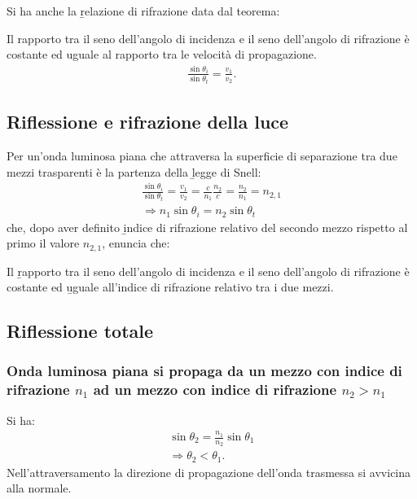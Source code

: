 Si ha anche la \b{relazione di rifrazione} data dal teorema:
\begin{teo}
Il rapporto tra il seno dell'angolo di incidenza e il seno dell'angolo di rifrazione è costante ed uguale al rapporto tra le velocità di propagazione.
\begin{equation}\begin{split}
\frac{\sin{\theta_i}}{\sin{\theta_t}}=\frac{v_1}{v_2}.
\end{split}\end{equation}
\end{teo}

\subsection{Riflessione e rifrazione della luce}
Per un'onda luminosa piana che attraversa la superficie di separazione tra due mezzi trasparenti è la partenza della \b{legge di Snell}:
\begin{equation}\begin{split}
\frac{\sin{\theta_i}}{\sin{\theta_t}}=\frac{v_1}{v_2}=\frac{c}{n_1}\frac{n_2}{c}=\frac{n_2}{n_1}=n_{2,1}\\
\Longrightarrow n_1\sin{\theta_i}=n_2\sin{\theta_t}
\end{split}\end{equation}
che, dopo aver definito \b{indice di rifrazione relativo del secondo mezzo rispetto al primo} il valore $n_{2,1}$, enuncia che:
\begin{teo}
Il \b{rapporto tra il seno dell'angolo di incidenza e il seno dell'angolo di rifrazione è costante} ed \b{uguale all'indice di rifrazione relativo tra i due mezzi}.
\end{teo}

\subsection{Riflessione totale}
\subsubsection{Onda luminosa piana si propaga da un mezzo con indice di rifrazione $n_1$ ad un mezzo con indice di rifrazione $n_2>n_1$}
Si ha:
\begin{equation}\begin{split}
\sin{\theta_2}=\frac{n_1}{n_2}\sin{\theta_1}\\
\Longrightarrow \theta_2<\theta_1.
\end{split}\end{equation}
Nell'attraversamento la direzione di propagazione dell'onda trasmessa si avvicina alla normale.

